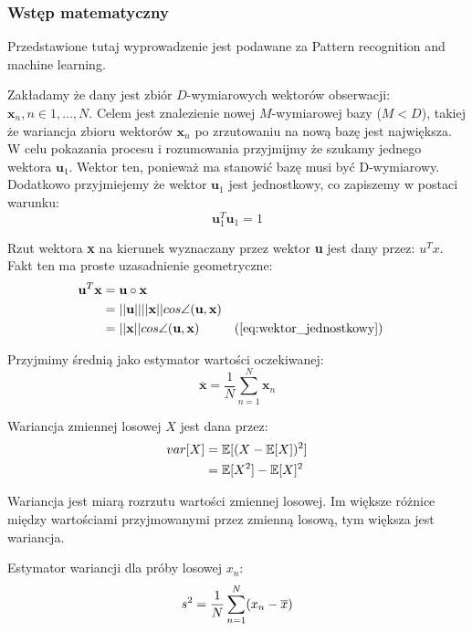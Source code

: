 \documentclass{article}
\newcommand{\bb}{\textbf}
\begin{document}
\subsubsection{Wstęp matematyczny}

Przedstawione tutaj wyprowadzenie jest podawane za Pattern recognition and machine learning.

Zakładamy że dany jest zbiór $D$-wymiarowych wektorów obserwacji: $\bb{x}_n , n \in 1,...,N $. Celem jest znalezienie nowej $M$-wymiarowej bazy ($M < D$), takiej że wariancja zbioru wektorów $\bb{x}_n$ po zrzutowaniu na nową bazę jest największa. W celu pokazania procesu i rozumowania przyjmijmy że szukamy jednego wektora $\bb{u}_1$. Wektor ten, ponieważ ma stanowić bazę musi być D-wymiarowy. Dodatkowo przyjmiejemy że wektor $\bb{u}_1$ jest jednostkowy, co zapiszemy w postaci warunku:
\begin{equation} \label{eq:wektor_jednostkowy}
	\bb{u}_1^{T}\bb{u}_1 = 1
\end{equation}

Rzut wektora \bb{x} na kierunek wyznaczany przez wektor \bb{u} jest dany przez: $u^{T}x$. Fakt ten ma proste uzasadnienie geometryczne:
\begin{align*}	
	\bb{u}^{T} \bb{x} &= \bb{u} \circ \bb{x} \\
		   & = ||\bb{u}|| ||\bb{x}|| cos \angle (\bb{u}, \bb{x}) \index{1} \\
		   &= ||\bb{x}|| cos \angle (\bb{u}, \bb{x}) \index{1} && \text{(\ref{eq:wektor_jednostkowy})}
\end{align*}

Przyjmimy średnią jako estymator wartości oczekiwanej:
\begin{equation}	\overline{\bb{x}} = \frac{1}{N} \sum_{n=1}^{N} \bb{x}_n \end{equation}

Wariancja zmiennej losowej $X$ jest dana przez:
\begin{align*}	\notag
	var[X]  &= \mathbb{E}[(X - \mathbb{E}[X])^2] \\
			&= \mathbb{E}[X^2] - \mathbb{E}[X]^2
\end{align*}

Wariancja jest miarą rozrzutu wartości zmiennej losowej. Im większe różnice między wartościami przyjmowanymi przez zmienną losową, tym większa jest wariancja.

Estymator wariancji dla próby losowej $x_n$:
\begin{equation}	\notag
	s^2 = \frac{1}{N} \sum_{n=1}^{N}(x_n - \overline{x})
\end{equation}
\end{document}

